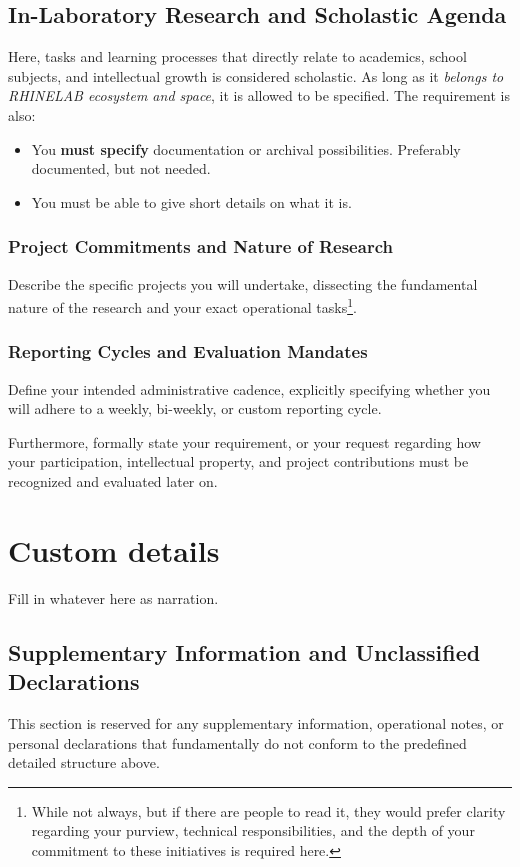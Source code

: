 \documentclass[10pt,a4paper]{article}
\begin{document}
\subsection{In-Laboratory Research and Scholastic Agenda}

Here, tasks and learning processes that directly relate to academics, school subjects, and intellectual growth is considered scholastic. As long as it \textit{belongs to RHINELAB ecosystem and space}, it is allowed to be specified. The requirement is also:

\begin{itemize}
    \item You \textbf{must specify} documentation or archival possibilities. Preferably documented, but not needed.  
    \item You must be able to give short details on what it is. 
\end{itemize}

\subsubsection{Project Commitments and Nature of Research}
Describe the specific projects you will undertake, dissecting the fundamental nature of the research and your exact operational tasks\footnote{While not always, but if there are people to read it, they would prefer clarity regarding your purview, technical responsibilities, and the depth of your commitment to these initiatives is required here.}.

\subsubsection{Reporting Cycles and Evaluation Mandates}
Define your intended administrative cadence, explicitly specifying whether you will adhere to a weekly, bi-weekly, or custom reporting cycle. 

Furthermore, formally state your requirement, or your request regarding how your participation, intellectual property, and project contributions must be recognized and evaluated later on.

\clearpage

\section{Custom details}

Fill in whatever here as narration. 

\subsection{Supplementary Information and Unclassified Declarations}
This section is reserved for any supplementary information, operational notes, or personal declarations that fundamentally do not conform to the predefined detailed structure above. 
\end{document}
